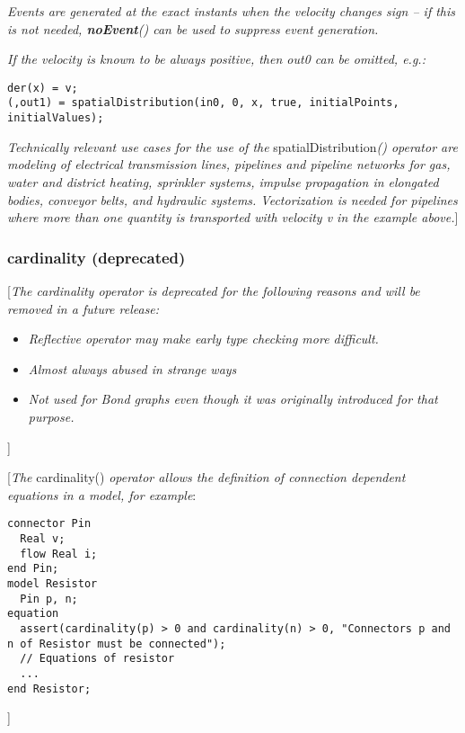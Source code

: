 \emph{Events are generated at the exact instants when the velocity
changes sign -- if this is not needed, \textbf{noEvent}() can be used to
suppress event generation.}

\emph{If the velocity is known to be always positive, then out0 can be
omitted, e.g.:}
\begin{lstlisting}[language=modelica]
der(x) = v;
(,out1) = spatialDistribution(in0, 0, x, true, initialPoints, initialValues);
\end{lstlisting}
\emph{Technically relevant use cases for the use of the}
spatialDistribution\emph{() operator are modeling of electrical
transmission lines, pipelines and pipeline networks for gas, water and
district heating, sprinkler systems, impulse propagation in elongated
bodies, conveyor belts, and hydraulic systems. Vectorization is needed
for pipelines where more than one quantity is transported with velocity
v in the example above.}{]}

\subsubsection{cardinality (deprecated)}

{[}\emph{The cardinality operator is deprecated for the following
reasons and will be removed in a future release:}

\begin{itemize}
\item
  \emph{Reflective operator may make early type checking more
  difficult.}
\item
  \emph{Almost always abused in strange ways}
\item
  \emph{Not used for Bond graphs even though it was originally
  introduced for that purpose.}
\end{itemize}

{]}

{[}\emph{The} cardinality() \emph{operator allows the definition of
connection dependent equations in a model, for example}:

\begin{lstlisting}[language=modelica]
connector Pin
  Real v;
  flow Real i;
end Pin;
model Resistor
  Pin p, n;
equation
  assert(cardinality(p) > 0 and cardinality(n) > 0, "Connectors p and n of Resistor must be connected");
  // Equations of resistor
  ...
end Resistor;
\end{lstlisting}

{]}

